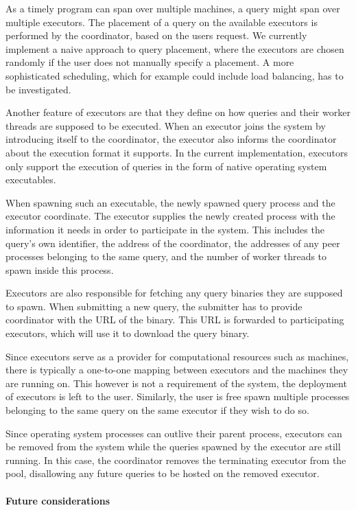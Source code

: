 As a timely program can span over multiple machines, a query might span
over multiple executors. The placement of a query on the available executors
is performed by the coordinator, based on the users request.
We currently implement a naive approach to query placement, where the executors
are chosen randomly if the user does not manually specify a placement. A more
sophisticated scheduling, which for example could include load balancing,
has to be investigated.

Another feature of executors are that they define on how queries and their
worker threads are supposed to be executed. When an executor joins
the system by introducing itself to the coordinator, the executor also informs
the coordinator about the execution format it supports. In the current
implementation, executors only support the execution of queries in the form of
native operating system executables.

When spawning such an executable, the newly spawned query process and the
executor coordinate. The executor supplies the newly created process with the information
it needs in order to participate in the system. This includes the query's own identifier,
the address of the coordinator, the addresses of any peer processes belonging to the 
same query, and the number of worker threads to spawn inside this process.

Executors are also responsible for fetching any query binaries they are supposed
to spawn. When submitting a new query, the submitter has to provide coordinator
with the URL of the binary. This URL is forwarded to participating executors,
which will use it to download the query binary. 

Since executors serve as a provider for computational resources such as machines,
there is typically a one-to-one mapping between executors and the machines they
are running on. This however is not a requirement of the system, the deployment of
executors is left to the user. Similarly, the user is free spawn multiple
processes belonging to the same query on the same executor if they wish to do so.

Since operating system processes can outlive their parent process, executors can
be removed from the system while the queries spawned by the executor are still
running. In this case, the coordinator removes the terminating executor from
the pool, disallowing any future queries to be hosted on the removed executor.

\paragraph{Future considerations}

